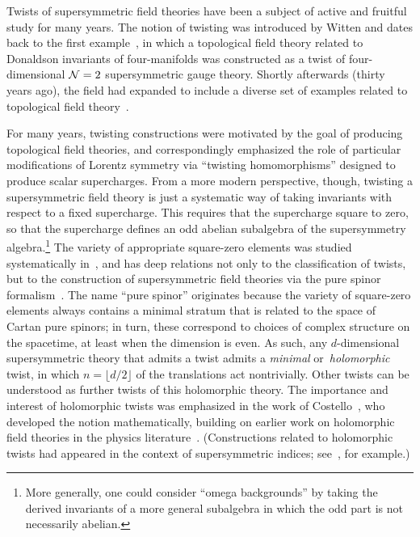 %
%
%
%
%
%
%

Twists of supersymmetric field theories have been a subject of active and fruitful study for many years. 
The notion of twisting was introduced by Witten and dates back to the first example~\cite{WittenTwist}, in which a topological field theory related to Donaldson invariants of four-manifolds was constructed as a twist of four-dimensional $\mathcal N=2$ supersymmetric gauge theory.
Shortly afterwards (thirty years ago), the field had expanded to include a diverse set of examples related to topological field theory~\cite{BlauThompson}. 

For many years, twisting constructions were motivated by the goal of producing topological field theories, and correspondingly emphasized the role of particular modifications of  Lorentz symmetry via ``twisting homomorphisms'' designed to produce scalar supercharges.
From a more modern perspective, though, twisting a supersymmetric field theory is just a systematic way of taking invariants with respect to a fixed supercharge. This requires that the supercharge square to zero, so that the supercharge defines an odd abelian subalgebra of the supersymmetry algebra.\footnote{More generally, one could consider ``omega backgrounds'' by taking the derived invariants of a more general subalgebra in which the odd part is not necessarily abelian.}
The variety of appropriate square-zero elements was studied systematically in~\cite{NV}, and has deep relations not only to the  classification of  twists, but to the construction  of supersymmetric field theories via the pure spinor formalism~\cite{Cederwall,EHSW}. The name ``pure spinor'' originates because the  variety of  square-zero elements always contains a minimal stratum that is related to the space of Cartan pure spinors; in turn, these correspond to choices of complex structure on the  spacetime, at least when the dimension is even. 
As such, any $d$-dimensional  supersymmetric theory that admits a twist admits a \emph{minimal} or~\emph{holomorphic} twist, in which $n=\lfloor d/2\rfloor$ of the translations act nontrivially. Other twists can be understood as further twists of this holomorphic theory.
The importance and interest of holomorphic twists was emphasized in the work of Costello~\cite{CostelloHol}, who developed the notion mathematically, building on earlier work on holomorphic field theories in the physics literature~\cite{NekThesis}. (Constructions related to holomorphic twists had appeared in the context of supersymmetric indices; see~\cite{Romelsberger}, for example.) 

